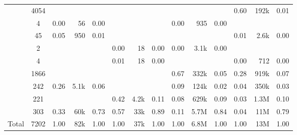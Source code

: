 \documentclass[
]{article}
\begin{document}
\begin{table}
\begin{tabular}[t]{rcrrcrrcrrcrrr}
 & 4054 & \cellcolor{gray}{  } & \cellcolor{gray}{  } & \cellcolor{gray}{  } & \cellcolor{gray}{  } & \cellcolor{gray}{  } & \cellcolor{gray}{  } & \cellcolor{gray}{  } & \cellcolor{gray}{  } & \cellcolor{gray}{  } & 0.60 & 192k & 0.01\\
\addlinespace
 & 4 & 0.00 & 56 & 0.00 & \cellcolor{gray}{  } & \cellcolor{gray}{  } & \cellcolor{gray}{  } & 0.00 & 935 & 0.00 & \cellcolor{gray}{  } & \cellcolor{gray}{  } & \cellcolor{gray}{  }\\
 & 45 & 0.05 & 950 & 0.01 & \cellcolor{gray}{  } & \cellcolor{gray}{  } & \cellcolor{gray}{  } & \cellcolor{gray}{  } & \cellcolor{gray}{  } & \cellcolor{gray}{  } & 0.01 & 2.6k & 0.00\\
 & 2 & \cellcolor{gray}{  } & \cellcolor{gray}{  } & \cellcolor{gray}{  } & 0.00 & 18 & 0.00 & 0.00 & 3.1k & 0.00 & \cellcolor{gray}{  } & \cellcolor{gray}{  } & \cellcolor{gray}{  }\\
 & 4 & \cellcolor{gray}{  } & \cellcolor{gray}{  } & \cellcolor{gray}{  } & 0.01 & 18 & 0.00 & \cellcolor{gray}{  } & \cellcolor{gray}{  } & \cellcolor{gray}{  } & 0.00 & 712 & 0.00\\
 & 1866 & \cellcolor{gray}{  } & \cellcolor{gray}{  } & \cellcolor{gray}{  } & \cellcolor{gray}{  } & \cellcolor{gray}{  } & \cellcolor{gray}{  } & 0.67 & 332k & 0.05 & 0.28 & 919k & 0.07\\
\addlinespace
 & 242 & 0.26 & 5.1k & 0.06 & \cellcolor{gray}{  } & \cellcolor{gray}{  } & \cellcolor{gray}{  } & 0.09 & 124k & 0.02 & 0.04 & 350k & 0.03\\
 & 221 & \cellcolor{gray}{  } & \cellcolor{gray}{  } & \cellcolor{gray}{  } & 0.42 & 4.2k & 0.11 & 0.08 & 629k & 0.09 & 0.03 & 1.3M & 0.10\\
\addlinespace
 & 303 & 0.33 & 60k & 0.73 & 0.57 & 33k & 0.89 & 0.11 & 5.7M & 0.84 & 0.04 & 11M & 0.79\\
\midrule
Total & 7202 & 1.00 & 82k & 1.00 & 1.00 & 37k & 1.00 & 1.00 & 6.8M & 1.00 & 1.00 & 13M & 1.00\\
\bottomrule
\end{tabular}
\end{table}
\end{document}
